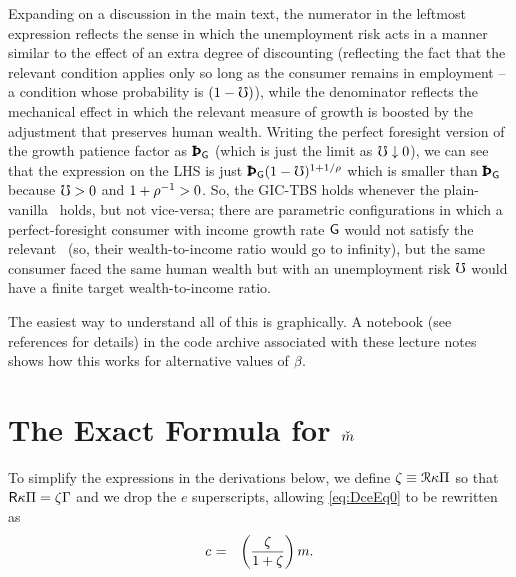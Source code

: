 \documentclass{handout}
\begin{document}
Expanding on a discussion in the main text, the numerator in the leftmost expression reflects the sense in which the unemployment risk acts in a manner similar to the effect of an extra degree of discounting (reflecting the fact that the relevant condition applies only so long as the consumer remains in employment -- a condition whose probability is $(1-\mho)$), while the denominator reflects the mechanical effect in which the relevant measure of growth is boosted by the adjustment that preserves human wealth.  Writing the perfect foresight version of the growth patience factor as $\Pat_{\WGro}$ (which is just the limit as $\mho \downarrow 0$), we can see that the expression on the LHS is just $\Pat_{\WGro}(1-\urate)^{1+1/\CRRA}$ which is smaller than $\Pat_{\WGro}$ because $\mho>0$ and $1+\rho^{-1} > 0$.  So, the GIC-TBS holds whenever the plain-vanilla \GICPGro~holds, but not vice-versa; there are parametric configurations in which a perfect-foresight consumer with income growth rate $\mathsf{G}$ would not satisfy the relevant \GICWGro~(so, their wealth-to-income ratio would go to infinity), but the same consumer faced the same human wealth but with an unemployment risk $\mho$ would have a finite target wealth-to-income ratio.  


The easiest way to understand all of this is graphically.  A notebook \cite{When-FHWC-Holds} (see references for details) in the code archive associated with these lecture notes shows how this works for alternative values of $\beta.$


\section{The Exact Formula for $\mTarg^{\null}$}\label{sec:mTargExact}

To simplify the expressions in the derivations below, we define $\zeta \equiv \mathcal{R} \kappa \Pi$ so that $\mathsf{R} \kappa \Pi = \zeta \Gamma$ and we drop the $e$ superscripts, allowing \eqref{eq:DceEq0} to be rewritten as 
\begin{eqnarray}
  \cRat_{\tSS} & = & \left(\frac{\zeta }{1+\zeta}\right)\mRat .
\end{eqnarray}
\end{document}
